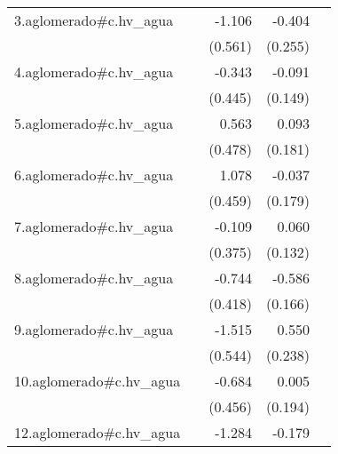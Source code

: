 {\begin{longtable}{l*{4}{D{.}{.}{-1}}}
\addlinespace
3.aglomerado#c.hv\_agua&                     &      -1.106\sym{*}  &      -0.404         &                     \\
            &                     &     (0.561)         &     (0.255)         &                     \\
\addlinespace
4.aglomerado#c.hv\_agua&                     &      -0.343         &      -0.091         &                     \\
            &                     &     (0.445)         &     (0.149)         &                     \\
\addlinespace
5.aglomerado#c.hv\_agua&                     &       0.563         &       0.093         &                     \\
            &                     &     (0.478)         &     (0.181)         &                     \\
\addlinespace
6.aglomerado#c.hv\_agua&                     &       1.078\sym{*}  &      -0.037         &                     \\
            &                     &     (0.459)         &     (0.179)         &                     \\
\addlinespace
7.aglomerado#c.hv\_agua&                     &      -0.109         &       0.060         &                     \\
            &                     &     (0.375)         &     (0.132)         &                     \\
\addlinespace
8.aglomerado#c.hv\_agua&                     &      -0.744         &      -0.586\sym{***}&                     \\
            &                     &     (0.418)         &     (0.166)         &                     \\
\addlinespace
9.aglomerado#c.hv\_agua&                     &      -1.515\sym{**} &       0.550\sym{*}  &                     \\
            &                     &     (0.544)         &     (0.238)         &                     \\
\addlinespace
10.aglomerado#c.hv\_agua&                     &      -0.684         &       0.005         &                     \\
            &                     &     (0.456)         &     (0.194)         &                     \\
\addlinespace
12.aglomerado#c.hv\_agua&                     &      -1.284\sym{*}  &      -0.179         &                     \\

\end{longtable}}
